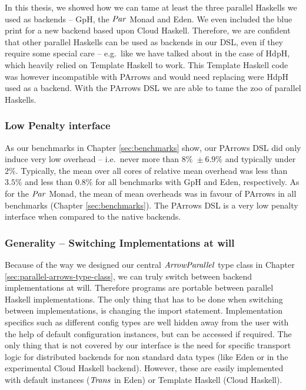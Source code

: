\documentclass[paper=A4,twoside=true,openright,parskip=full,chapterprefix=true,headings=normal,bibliography=totoc,listof=totoc,titlepage=on,captions=tableabove,draft=false,british]{scrreprt}%
\begin{document}
In this thesis, we showed how we can tame at least the three parallel
Haskells we used as backends -- GpH, the \ensuremath{\Conid{Par}} Monad and Eden. We even
included the blue print for a new backend based upon Cloud Haskell.
Therefore, we are confident that other parallel Haskells can be used as
backends in our DSL, even if they require some special care -- e.g.~like
we have talked about in the case of HdpH, which heavily relied on
Template Haskell to work. This Template Haskell code was however
incompatible with PArrows and would need replacing were HdpH used as a
backend. With the PArrows DSL we are able to tame the zoo of parallel
Haskells.

\hypertarget{low-penalty-interface}{%
\subsubsection{Low Penalty interface}\label{low-penalty-interface}}

As our benchmarks in Chapter \ref{sec:benchmarks} show, our PArrows DSL
did only induce very low overhead -- i.e.~never more than
\(8\% \; \pm 6.9\%\) and typically under \(2\%\). Typically, the mean
over all cores of relative mean overhead was less than \(3.5\%\) and
less than \(0.8\%\) for all benchmarks with GpH and Eden, respectively.
As for the \ensuremath{\Conid{Par}} Monad, the mean of mean overheads was in favour of
PArrows in all benchmarks (Chapter \ref{sec:benchmarks}). The PArrows
DSL is a very low penalty interface when compared to the native
backends.

\hypertarget{generality-switching-implementations-at-will}{%
\subsubsection{Generality -- Switching Implementations at
will}\label{generality-switching-implementations-at-will}}

Because of the way we designed our central \ensuremath{\Conid{ArrowParallel}} type class in
Chapter \ref{sec:parallel-arrows-type-class}, we can truly switch
between backend implementations at will. Therefore programs are portable
between parallel Haskell implementations. The only thing that has to be
done when switching between implementations, is changing the import
statement. Implementation specifics such as different config types are
well hidden away from the user with the help of default configuration
instances, but can be accessed if required. The only thing that is not
covered by our interface is the need for specific transport logic for
distributed backends for non standard data types (like Eden or in the
experimental Cloud Haskell backend). However, these are easily
implemented with default instances (\ensuremath{\Conid{Trans}} in Eden) or Template Haskell
(Cloud Haskell).
\end{document}
